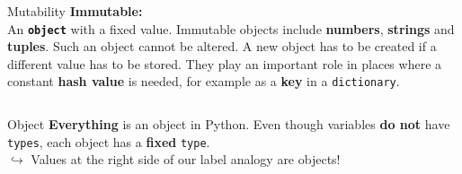     \begin{frame}{Mutability}
        \huge
        \textbf{Immutable:}\\
        \LARGE
        An \texttt{\textbf{object}} with a fixed value.
         Immutable objects include \textbf{numbers}, \textbf{strings} and \textbf{tuples}. Such an object cannot be altered.
         A new object has to be created if a different value has to be stored.
         They play an important role in places where a constant \textbf{hash value} is needed, for example as a \textbf{key} in a \texttt{dictionary}.
        \inputminted[frame=single,framesep=2pt]{python3}{code-examples/value_update.py}
    \end{frame}

    \begin{frame}{Object}
        \LARGE
        \textbf{Everything} is an object in Python.
        \pause
         Even though variables \textbf{do not} have \texttt{types}, each object has a \textbf{fixed} \texttt{type}.\\
        \pause
        $\hookrightarrow$ Values at the right side of our label analogy are objects!
        \bigskip
        \begin{columns}
            \begin{column}[c]{0.5\textwidth}
                \LARGE
            \end{column}
            \begin{column}[c]{0.5\textwidth}
           \end{column}
       \end{columns}
    \end{frame}

